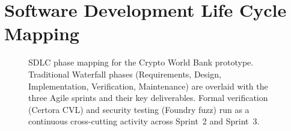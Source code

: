 
\section{Software Development Life Cycle Mapping}
\label{sec:sdlc-mapping}

\begin{figure}[H]
\centering
{}
\caption{SDLC phase mapping for the Crypto World Bank prototype. Traditional
Waterfall phases (Requirements, Design, Implementation, Verification,
Maintenance) are overlaid with the three Agile sprints and their key
deliverables. Formal verification (Certora CVL) and security testing (Foundry
fuzz) run as a continuous cross-cutting activity across Sprint~2 and
Sprint~3.}
\label{fig:sdlc-mapping}
\label{fig:methodology-technical}
\end{figure}

